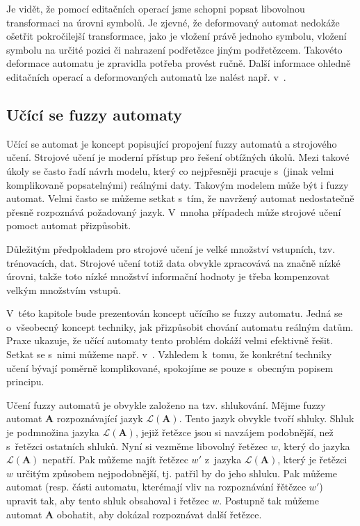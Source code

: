 Je vidět, že pomocí editačních operací jsme schopni popsat libovolnou transformaci na úrovni symbolů. Je zjevné, že deformovaný automat nedokáže ošetřit pokročilejší transformace, jako je vložení právě jednoho symbolu, vložení symbolu na určité pozici či nahrazení podřetězce jiným podřetězcem. Takovéto deformace automatu je zpravidla potřeba provést ručně. Další informace ohledně editačních operací a deformovaných automatů lze nalést např. v~\cite{Ast+-FuzzAutEpsMovCmpFuzzMeasBtwStrs}.

\subsection{Učící se fuzzy automaty}
Učící se automat je koncept popisující propojení fuzzy automatů a strojového učení. Strojové učení je moderní přístup pro řešení obtížných úkolů. Mezi takové úkoly se často řadí návrh modelu, který co nejpřesněji pracuje s~(jinak velmi komplikovaně popsatelnými) reálnými daty. Takovým modelem může být i fuzzy automat. Velmi často se můžeme setkat s~tím, že navržený automat nedostatečně přesně rozpoznává požadovaný jazyk. V~mnoha případech může strojové učení pomoct automat přizpůsobit.

Důležitým předpokladem pro strojové učení je velké množství vstupních, tzv. trénovacích, dat. Strojové učení totiž data obvykle zpracovává na značně nízké úrovni, takže toto nízké množství informační hodnoty je třeba kompenzovat velkým množstvím vstupů.

V~této kapitole bude prezentován koncept učícího se fuzzy automatu. Jedná se o~všeobecný koncept techniky, jak přizpůsobit chování automatu reálným datům. Praxe ukazuje, že učící automaty tento problém dokáží velmi efektivně řešit. Setkat se s~nimi můžeme např. v~\cite{FuLi-ForLeaAutAutGam, WeeFu-FormFuzAutAppModLeaSys, GilOmlTho-EquKnoRep+, TzaRig-StaAnaAdaFuzzConSysUsiPetrNetLeaAut, PatMor-EdgDetTecFuzzLogCEllLeaAutFuzzImPro, MarMeySol-HybMetGasDifModFuzCelAutImSha, SinGha+HybrEdgDetMetFuzSetTheCelLeaAut, AstGariGonVillFar-ApprStrMatUsiDefFuzzAutLearExpr, ZhiMinLan-EvoStraIndFuFiStaAu}. Vzhledem k~tomu, že konkrétní techniky učení bývají poměrně komplikované, spokojíme se pouze s~obecným popisem principu.

Učení fuzzy automatů je obvykle založeno na tzv. shlukování. Mějme fuzzy automat $\mathbf{A}$ rozpoznávající jazyk  $\mathcal{L}(\mathbf{A})$. Tento jazyk obvykle tvoří shluky. Shluk je podmnožina jazyka $\mathcal{L}(\mathbf{A})$, jejiž řetězce jsou si navzájem podobnější, než s~řetězci ostatních shluků. Nyní si vezměme libovolný řetězec $w$, který do jazyka $\mathcal{L}(\mathbf{A})$ nepatří. Pak můžeme najít řetězec $w'$ z~jazyka $\mathcal{L}(\mathbf{A})$, který je řetězci $w$ určitým způsobem nejpodobnější, tj. patřil by do jeho shluku. Pak můžeme automat (resp. části automatu, kterémají vliv na rozpoznávání řětězce $w'$) upravit tak, aby tento shluk obsahoval i řetězec $w$. Postupně tak můžeme automat $\mathbf{A}$ obohatit, aby dokázal rozpoznávat další řetězce.

